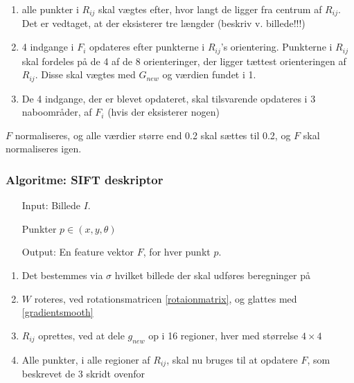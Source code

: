 \begin{enumerate}
\item{ alle punkter i $R_{ij}$ skal vægtes efter, hvor langt de ligger fra centrum af $R_{ij}$. Det er vedtaget, at der eksisterer tre længder (beskriv v. billede!!!)}
\item{ 4 indgange i $F_i$ opdateres efter punkterne i $R_{ij}$'s orientering. Punkterne i $R_{ij}$ skal fordeles på de 4 af de 8 orienteringer, der ligger tættest orienteringen af $R_{ij}$. Disse skal vægtes med $G_{new}$ og værdien fundet i 1. }
\item{ De 4 indgange, der er blevet opdateret, skal tilsvarende opdateres i 3 naboområder, af $F_i$ (hvis der eksisterer nogen)}
\end{enumerate}

$F$ normaliseres, og alle værdier større end 0.2 skal sættes til 0.2, og $F$ skal normaliseres igen.
\subsubsection*{Algoritme: SIFT deskriptor}
\begin{enumerate}
\item[Input:] Billede $I$.
\item[] Punkter $p \in (x, y, \theta)$
\item[Output:] En feature vektor $F$, for hver punkt $p$.
\end{enumerate}
\begin{enumerate}
\item Det bestemmes via $\sigma$ hvilket billede der skal udføres beregninger på
\item $W$ roteres, ved rotationsmatricen \eqref{rotaionmatrix}, og glattes med \eqref{gradientsmooth}
\item $R_{ij}$ oprettes, ved at dele $g_{new}$ op i 16 regioner, hver med størrelse $4\times4$
\item Alle punkter, i alle regioner af $R_{ij}$, skal nu bruges til at opdatere $F$, som beskrevet de 3 skridt ovenfor
\end{enumerate}